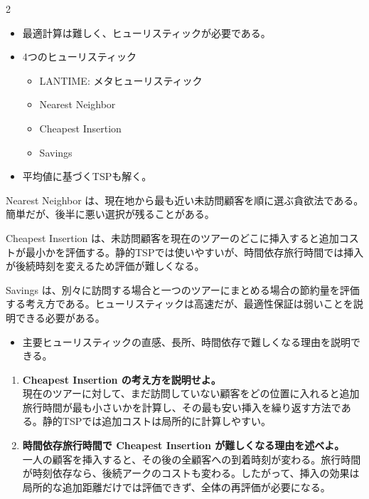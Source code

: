 \clearpage
{}
\begin{multicols}{2}\footnotesize\raggedcolumns
{}
\begin{itemize}
\item 最適計算は難しく、ヒューリスティックが必要である。
\item 4つのヒューリスティック
\begin{itemize}
\item LANTIME: メタヒューリスティック
\item Nearest Neighbor
\item Cheapest Insertion
\item Savings
\end{itemize}
\item 平均値に基づくTSPも解く。
\end{itemize}
Nearest Neighbor は、現在地から最も近い未訪問顧客を順に選ぶ貪欲法である。簡単だが、後半に悪い選択が残ることがある。\par

Cheapest Insertion は、未訪問顧客を現在のツアーのどこに挿入すると追加コストが最小かを評価する。静的TSPでは使いやすいが、時間依存旅行時間では挿入が後続時刻を変えるため評価が難しくなる。\par

Savings は、別々に訪問する場合と一つのツアーにまとめる場合の節約量を評価する考え方である。ヒューリスティックは高速だが、最適性保証は弱いことを説明できる必要がある。\par
{}
\begin{itemize}
\item 主要ヒューリスティックの直感、長所、時間依存で難しくなる理由を説明できる。
\end{itemize}
\begin{enumerate}
\item \textbf{Cheapest Insertion の考え方を説明せよ。}\\現在のツアーに対して、まだ訪問していない顧客をどの位置に入れると追加旅行時間が最も小さいかを計算し、その最も安い挿入を繰り返す方法である。静的TSPでは追加コストは局所的に計算しやすい。
\item \textbf{時間依存旅行時間で Cheapest Insertion が難しくなる理由を述べよ。}\\一人の顧客を挿入すると、その後の全顧客への到着時刻が変わる。旅行時間が時刻依存なら、後続アークのコストも変わる。したがって、挿入の効果は局所的な追加距離だけでは評価できず、全体の再評価が必要になる。
\end{enumerate}
\end{multicols}

